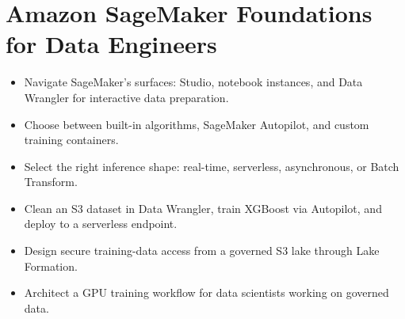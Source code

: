 \chapter{Amazon SageMaker Foundations for Data Engineers}
%
\begin{objectives}
\begin{itemize}
    \item Navigate SageMaker's surfaces: Studio, notebook instances, and Data Wrangler for interactive data preparation.
    \item Choose between built-in algorithms, SageMaker Autopilot, and custom training containers.
    \item Select the right inference shape: real-time, serverless, asynchronous, or Batch Transform.
    \item Clean an S3 dataset in Data Wrangler, train XGBoost via Autopilot, and deploy to a serverless endpoint.
    \item Design secure training-data access from a governed S3 lake through Lake Formation.
    \item Architect a GPU training workflow for data scientists working on governed data.
\end{itemize}
\end{objectives}

